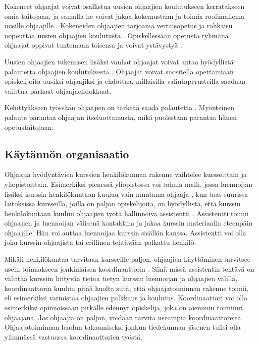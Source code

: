 \documentclass[finnish]{tktltiki2}
\theoremstyle{definition}
\theoremstyle{remark}
\begin{document}
Kokeneet ohjaajat voivat osallistua uusien ohjaajien koulutukseen kerratakseen omia taitojaan, ja samalla he voivat jakaa kokemustaan ja toimia roolimalleina uusille ohjaajille \cite{Reges88}. Kokeneiden ohjaajien tarjoama vertaisopetus ja rohkaisu nopeuttaa uusien ohjaajien koulutusta \cite{Decker06}. Opiskellessaan opetusta ryhmänä ohjaajat oppivat tuntemaan toisensa ja voivat ystävystyä \cite{Roberts95}. \par

Uusien ohjaajien tukemisen lisäksi vanhat ohjaajat voivat antaa hyödyllistä palautetta ohjaajien koulutuksesta \cite{Decker06}. Ohjaajat voivat suositella opettamiaan opiskelijoita uusiksi ohjaajiksi ja ehdottaa, millaisilla valintaperusteilla saadaan valittua parhaat ohjaajaehdokkaat.  \par

Kehittyäkseen työssään ohjaajien on tärkeää saada palautetta \cite{Patitsas12, Patitsas12_3}. Myönteinen palaute parantaa ohjaajan itseluottamusta, mikä puolestaan parantaa hänen opetustaitojaan. \par





\subsection{Käytännön organisaatio}

Ohjaajia hyödyntävien kurssien henkilökunnan rakenne vaihtelee kursseittain ja yliopistoittain. Esimerkiksi pienessä yliopistossa voi toimia malli, jossa luennoijan lisäksi kurssin henkilökuntaan kuuluu vain muutama ohjaaja \cite{Dickson11}, kun taas suurissa laitoksissa kursseilla, joilla on paljon opiskelijoita, on hyödyllistä, että kurssin henkilökuntaan kuuluu ohjaajien työtä hallinnoiva assistentti \cite{Reges03}. Assistentti toimii ohjaajien ja luennoijan välisenä kontaktina ja jakaa kurssin materiaalin eteenpäin ohjaajille. Hän voi auttaa luennoijaa kurssin sisällön kanssa. Assistentti voi olla joku kurssin ohjaajista tai erillinen tehtävään palkattu henkilö. \par

Mikäli henkilökuntaa tarvitaan kursseille paljon, ohjaajien käyttäminen tarvitsee usein toimiakseen jonkinlaisen koordinaattorin \cite{Roberts95}. Siinä missä assistentin tehtävä on välittää kurssiin liittyvää tietoa tietyn kurssin luennoijan ja ohjaajien välillä, koordinaattorin kuuluu pitää huolta siitä, että ohjaajatoiminnan rakenne toimii, eli esimerkiksi varmistaa ohjaajien palkkaus ja koulutus. Koordinaattori voi olla esimerkiksi opinnoissaan pitkälle edennyt opiskelija, joka on aiemmin toiminut ohjaajana. Jos ohjaajia on paljon, voidaan tarvita useampia koordinaattoreita. Ohjaajatoiminnan laadun takaamiseksi jonkun tiedekunnan jäsenen tulisi olla ylimmässä vastuussa koordinaattorien työstä. \par
\end{document}

